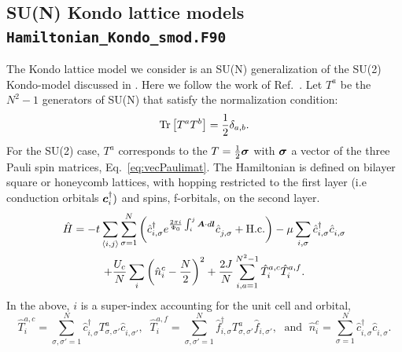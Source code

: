 

\subsection{SU(N) Kondo lattice models \texttt{Hamiltonian\_Kondo\_smod.F90}}  \label{sec:kondo}

The Kondo lattice model we consider is an SU(N) generalization of the SU(2) Kondo-model discussed in \cite{Capponi00,Assaad99a}.
Here we follow the work of  Ref.~\cite{Raczkowski20}.
Let $T^{a}$ be the $N^2 -1  $ generators of SU(N) that satisfy the normalization condition: 
\begin{equation}
	\mathop{\mathrm{Tr}}  \left[ T^{a} T^{b} \right]   = \frac{1}{2}\delta_{a,b}.
\label{Normalization_condition.eq}
\end{equation}
For the SU(2) case, $T^{a}$  corresponds to the $T  = \frac{1}{2} \boldsymbol{\sigma}$ with $\boldsymbol{\sigma}$   a vector of the three Pauli spin matrices, Eq.~\eqref{eq:vecPaulimat}.      The   Hamiltonian is defined on bilayer  square or honeycomb lattices, with  hopping restricted to the  first layer  (i.e  conduction orbitals $\boldsymbol{c}^{\dagger}_{i}  )$   and  spins, f-orbitals, on the second layer. 
\begin{multline}
	\hat{H} = - t  \sum_{\langle i,j \rangle}    \sum_{\sigma=1}^{N}  \left(  \hat{c}^{\dagger}_{i,\sigma}  e^{\frac{2\pi i}{\Phi_0}  \int_{i}^{j} \ve{A}\cdot d \ve{l}}\hat{c}^{\phantom\dagger}_{j,\sigma}   + \hc  \right)  - \mu \sum_{i,\sigma} \hat{c}^{\dagger}_{i,\sigma}  \hat{c}^{\phantom\dagger}_{i,\sigma}  \\ 
   + \frac{U_c}{N}  \sum_{i}   \left( \hat{n}^c_i -  \frac{N}{2} \right)^2  
         +  \frac{2 J}{N} \sum_{i, a=1  }^{N^2 -1}  \hat{T}^{a,c}_{i}  \hat{T}^{a,f}_{i}. 
\label{Kondo_SUN_Ham.eq}
\end{multline}
In the above, $i$ is a super-index accounting for the unit cell and orbital,
\begin{equation}
	 \hat{T}^{a,c}_{i}   =   \sum_{\sigma,\sigma'=1}^{N} \hat{c}^{\dagger}_{i,\sigma}T^{a}_{\sigma,\sigma'}  \hat{c}^{\phantom\dagger}_{i,\sigma'}, \; \; 
	  \hat{T}^{a,f}_{i}   = \sum_{\sigma,\sigma'=1}^{N} \hat{f}^{\dagger}_{i,\sigma} T^{a}_{\sigma,\sigma'}  \hat{f}^{\phantom\dagger}_{i,\sigma'},  
	  \;\text{ and }\;   \hat{n}^c_i  = \sum_{\sigma=1}^{N} \hat{c}_{i,\sigma}^{\dagger} \hat{c}_{i,\sigma}^{\phantom\dagger} .
\end{equation}
